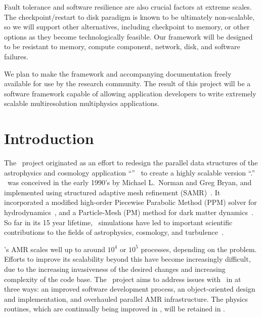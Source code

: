 \documentclass[10pt,twocolumn]{article}
\begin{document}
Fault tolerance and software resilience are also crucial factors at
extreme scales.  The checkpoint/restart to disk paradigm is known to
be ultimately non-scalable, so we will support other alternatives,
including checkpoint to memory, or other options as they become
technologically feasible.  Our framework will be designed to be
resistant to memory, compute component, network, disk, and software
failures.

We plan to make the framework and accompanying documentation freely
available for use by the research community.  The result of this
project will be a software framework capable of allowing application
developers to write extremely scalable multiresolution multiphysics
applications.

\section{Introduction} \label{s:intro}


The \cello\ project originated as an effort to redesign the parallel
data structures of the astrophysics and cosmology application
``\enzo''~\cite{OsBr04} to create a highly scalable version
``\enzoii.''  \enzo\ was conceived in the early 1990's by Michael
L.~Norman and Greg Bryan, and implemented using structured adaptive
mesh refinement (SAMR)~\cite{BeCo89}.  It incorporated a modified
high-order Piecewise Parabolic Method (PPM) solver for
hydrodynamics~\cite{WoCo84b}, and a Particle-Mesh (PM) method for dark
matter dynamics~\cite{@@@PM}.  So far in its 15 year lifetime, \enzo\
simulations have led to important scientific contributions to the
fields of astrophysics, cosmology, and
turbulence~\cite{@@@enzo-science}.

\enzo's AMR scales well up to around $10^4$ or $10^5$ processes,
depending on the problem.  Efforts to improve its scalability beyond
this have become increasingly difficult, due to the increasing
invasiveness of the desired changes and increasing complexity of the
code base.  The \cello\ project aims to address issues with \enzo\ in
at three ways: an improved software development process, an
object-oriented design and implementation, and overhauled parallel AMR
infrastructure.  The physics routines, which are continually being
improved in \enzo, will be retained in \enzoii.
\end{document}
